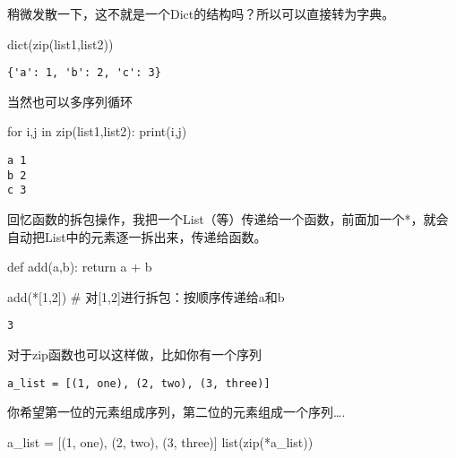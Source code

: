 \documentclass[
  letterpaper,
  DIV=11,
  numbers=noendperiod]{scrreprt}
\newenvironment{Shaded}{\begin{snugshade}}{\end{snugshade}}
\newcommand{\BuiltInTok}[1]{\textcolor[rgb]{0.00,0.23,0.31}{#1}}
\newcommand{\CommentTok}[1]{\textcolor[rgb]{0.37,0.37,0.37}{#1}}
\newcommand{\ControlFlowTok}[1]{\textcolor[rgb]{0.00,0.23,0.31}{#1}}
\newcommand{\DecValTok}[1]{\textcolor[rgb]{0.68,0.00,0.00}{#1}}
\newcommand{\KeywordTok}[1]{\textcolor[rgb]{0.00,0.23,0.31}{#1}}
\newcommand{\NormalTok}[1]{\textcolor[rgb]{0.00,0.23,0.31}{#1}}
\newcommand{\OperatorTok}[1]{\textcolor[rgb]{0.37,0.37,0.37}{#1}}
\newcommand{\StringTok}[1]{\textcolor[rgb]{0.13,0.47,0.30}{#1}}
\begin{document}
稍微发散一下，这不就是一个Dict的结构吗？所以可以直接转为字典。

\begin{Shaded}
\begin{Highlighting}[]
\BuiltInTok{dict}\NormalTok{(}\BuiltInTok{zip}\NormalTok{(list1,list2))}
\end{Highlighting}
\end{Shaded}

\begin{verbatim}
{'a': 1, 'b': 2, 'c': 3}
\end{verbatim}

当然也可以多序列循环

\begin{Shaded}
\begin{Highlighting}[]
\ControlFlowTok{for}\NormalTok{ i,j }\KeywordTok{in} \BuiltInTok{zip}\NormalTok{(list1,list2):}
    \BuiltInTok{print}\NormalTok{(i,j)}
\end{Highlighting}
\end{Shaded}

\begin{verbatim}
a 1
b 2
c 3
\end{verbatim}

回忆函数的拆包操作，我把一个List（等）传递给一个函数，前面加一个*，就会自动把List中的元素逐一拆出来，传递给函数。

\begin{Shaded}
\begin{Highlighting}[]
\KeywordTok{def}\NormalTok{ add(a,b):}
    \ControlFlowTok{return}\NormalTok{ a }\OperatorTok{+}\NormalTok{ b}

\NormalTok{add(}\OperatorTok{*}\NormalTok{[}\DecValTok{1}\NormalTok{,}\DecValTok{2}\NormalTok{]) }\CommentTok{\# 对[1,2]进行拆包：按顺序传递给a和b}
\end{Highlighting}
\end{Shaded}

\begin{verbatim}
3
\end{verbatim}

对于zip函数也可以这样做，比如你有一个序列

\texttt{a\_list\ =\ {[}(1,\ \textquotesingle{}one\textquotesingle{}),\ (2,\ \textquotesingle{}two\textquotesingle{}),\ (3,\ \textquotesingle{}three\textquotesingle{}){]}}

你希望第一位的元素组成序列，第二位的元素组成一个序列\ldots.

\begin{Shaded}
\begin{Highlighting}[]
\NormalTok{a\_list }\OperatorTok{=}\NormalTok{ [(}\DecValTok{1}\NormalTok{, }\StringTok{\textquotesingle{}one\textquotesingle{}}\NormalTok{), (}\DecValTok{2}\NormalTok{, }\StringTok{\textquotesingle{}two\textquotesingle{}}\NormalTok{), (}\DecValTok{3}\NormalTok{, }\StringTok{\textquotesingle{}three\textquotesingle{}}\NormalTok{)]}
\BuiltInTok{list}\NormalTok{(}\BuiltInTok{zip}\NormalTok{(}\OperatorTok{*}\NormalTok{a\_list))}
\end{Highlighting}
\end{Shaded}
\end{document}
